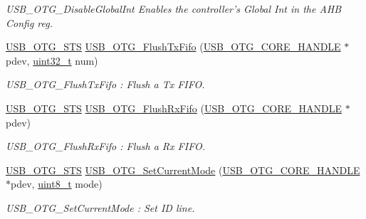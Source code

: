 \begin{DoxyCompactItemize}
\begin{DoxyCompactList}\small\item\em U\-S\-B\-\_\-\-O\-T\-G\-\_\-\-Disable\-Global\-Int Enables the controller's Global Int in the A\-H\-B Config reg. \end{DoxyCompactList}\item 
\hyperlink{group___u_s_b___c_o_r_e___exported___types_ga8b6504b9af0662f17515795db0f9c8ed}{U\-S\-B\-\_\-\-O\-T\-G\-\_\-\-S\-T\-S} \hyperlink{group___u_s_b___c_o_r_e___private___functions_ga2558e8a44531a7053e74731e66a4a903}{U\-S\-B\-\_\-\-O\-T\-G\-\_\-\-Flush\-Tx\-Fifo} (\hyperlink{group___u_s_b___c_o_r_e___exported___types_gaf76054c11eb8a3367907aad7ae700e80}{U\-S\-B\-\_\-\-O\-T\-G\-\_\-\-C\-O\-R\-E\-\_\-\-H\-A\-N\-D\-L\-E} $\ast$pdev, \hyperlink{stdint_8h_a435d1572bf3f880d55459d9805097f62}{uint32\-\_\-t} num)
\begin{DoxyCompactList}\small\item\em U\-S\-B\-\_\-\-O\-T\-G\-\_\-\-Flush\-Tx\-Fifo \-: Flush a Tx F\-I\-F\-O. \end{DoxyCompactList}\item 
\hyperlink{group___u_s_b___c_o_r_e___exported___types_ga8b6504b9af0662f17515795db0f9c8ed}{U\-S\-B\-\_\-\-O\-T\-G\-\_\-\-S\-T\-S} \hyperlink{group___u_s_b___c_o_r_e___private___functions_ga51e591e5eb2247277e8c13e864a9c02c}{U\-S\-B\-\_\-\-O\-T\-G\-\_\-\-Flush\-Rx\-Fifo} (\hyperlink{group___u_s_b___c_o_r_e___exported___types_gaf76054c11eb8a3367907aad7ae700e80}{U\-S\-B\-\_\-\-O\-T\-G\-\_\-\-C\-O\-R\-E\-\_\-\-H\-A\-N\-D\-L\-E} $\ast$pdev)
\begin{DoxyCompactList}\small\item\em U\-S\-B\-\_\-\-O\-T\-G\-\_\-\-Flush\-Rx\-Fifo \-: Flush a Rx F\-I\-F\-O. \end{DoxyCompactList}\item 
\hyperlink{group___u_s_b___c_o_r_e___exported___types_ga8b6504b9af0662f17515795db0f9c8ed}{U\-S\-B\-\_\-\-O\-T\-G\-\_\-\-S\-T\-S} \hyperlink{group___u_s_b___c_o_r_e___private___functions_gade650586d970526c5f66288a93bc37a6}{U\-S\-B\-\_\-\-O\-T\-G\-\_\-\-Set\-Current\-Mode} (\hyperlink{group___u_s_b___c_o_r_e___exported___types_gaf76054c11eb8a3367907aad7ae700e80}{U\-S\-B\-\_\-\-O\-T\-G\-\_\-\-C\-O\-R\-E\-\_\-\-H\-A\-N\-D\-L\-E} $\ast$pdev, \hyperlink{stdint_8h_aba7bc1797add20fe3efdf37ced1182c5}{uint8\-\_\-t} mode)
\begin{DoxyCompactList}\small\item\em U\-S\-B\-\_\-\-O\-T\-G\-\_\-\-Set\-Current\-Mode \-: Set I\-D line. \end{DoxyCompactList}\item 

\end{DoxyCompactItemize}
